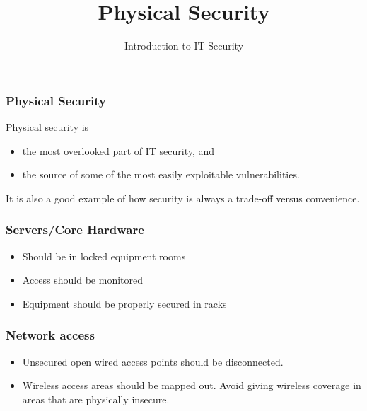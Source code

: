 \documentclass[10pt]{beamer}
\title{Physical Security}
\author[IN618]{Introduction to IT Security}
\institute[Otago Polytechnic]{
  Otago Polytechnic \\
  Dunedin, New Zealand \\
}
\date{}
\begin{document}
\begin{frame}[plain]
  \titlepage
\end{frame}



\begin{frame}
  \frametitle{Physical Security}


  Physical security is

 \begin{itemize}
  \item the most overlooked part of IT security, and
  \item the source of some of the most easily exploitable vulnerabilities.
 \end{itemize}

 It is also a good example of how security is always a trade-off versus
 convenience.

\end{frame}



\begin{frame}
  \frametitle{Servers/Core Hardware}


 \begin{itemize}
  \item Should be in locked equipment rooms
  \item Access should be monitored
  \item Equipment should be properly secured in racks
 \end{itemize}
\end{frame} 


\begin{frame}
  \frametitle{Network access}


 \begin{itemize}
  \item Unsecured open wired access points should be disconnected.
  \item Wireless access areas should be mapped out.  Avoid giving wireless
	  coverage in areas that are physically insecure.
 \end{itemize}
\end{frame}
\end{document}
